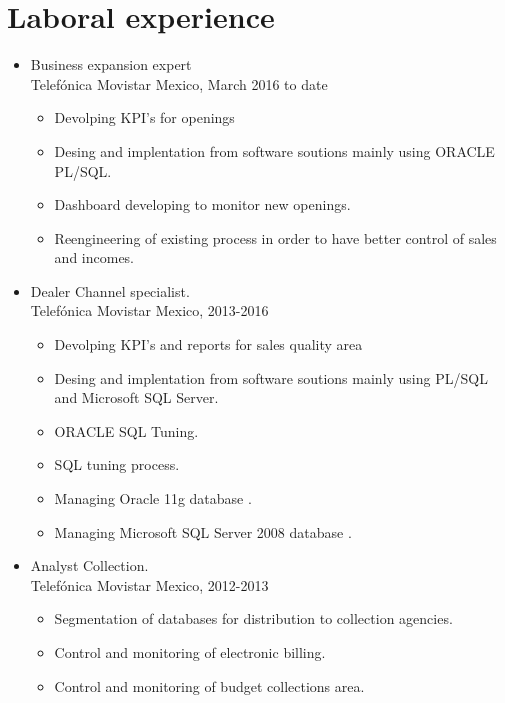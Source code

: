 \documentclass[21pt, onecolumn]{article} %
\begin{document}
\section*{ Laboral experience}


\begin{itemize}
 \item Business expansion expert\\
 Telefónica Movistar Mexico, {March 2016 to date}
 \begin{itemize}
 \item Devolping  KPI's for openings
\item Desing  and implentation  from  software  soutions
 mainly using  ORACLE PL/SQL.
\item Dashboard developing to monitor new openings.
\item Reengineering of existing process in order to have better control of sales and incomes.

 \end{itemize}
 \end{itemize}

\begin{itemize}
 \item Dealer Channel specialist.\\
 Telefónica Movistar Mexico, {2013-2016}
 \begin{itemize}
 \item Devolping  KPI's  and reports for  sales quality area
\item Desing  and implentation  from  software  soutions
 mainly using  PL/SQL and Microsoft SQL Server.
\item ORACLE SQL Tuning.
\item SQL tuning process.
\item Managing Oracle 11g database .
\item Managing Microsoft SQL Server 2008 database .
 \end{itemize}

\end{itemize}

\begin{itemize}
 \item Analyst Collection.\\
 Telefónica Movistar Mexico, {2012-2013}
 \begin{itemize}
  \item Segmentation of databases for distribution to 
  collection agencies.
 \item Control and monitoring of electronic billing.
  \item Control and monitoring of budget collections area.
 \end{itemize}

\end{itemize}
\end{document}
